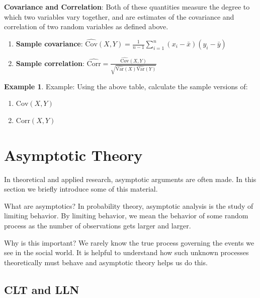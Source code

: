 \documentclass[
]{book}
\providecommand{\tightlist}{%
  \setlength{\itemsep}{0pt}\setlength{\parskip}{0pt}}
\theoremstyle{definition}
\theoremstyle{definition}
\newtheorem{example}{Example}[chapter]
\theoremstyle{definition}
\theoremstyle{remark}
\begin{document}
\textbf{Covariance and Correlation}: Both of these quantities measure the degree to which two variables vary together, and are estimates of the covariance and correlation of two random variables as defined above.

\begin{enumerate}
\def\labelenumi{\arabic{enumi}.}
\tightlist
\item
  \textbf{Sample covariance}: \(\hat{\text{Cov}}(X,Y) = \frac{1}{n-1}\sum_{i = 1}^n(x_i - \bar{x})(y_i - \bar{y})\)
\item
  \textbf{Sample correlation}: \(\hat{\text{Corr}} = \frac{\hat{\text{Cov}}(X,Y)}{\sqrt{\hat{\text{Var}}(X)\hat{\text{Var}}(Y)}}\)
\end{enumerate}

\begin{example}
\protect\hypertarget{exm:unnamed-chunk-94}{}{\label{exm:unnamed-chunk-94} }Example: Using the above table, calculate the sample versions of:

\begin{enumerate}
\def\labelenumi{\arabic{enumi}.}
\tightlist
\item
  \(\text{Cov}(X,Y)\)
\item
  \(\text{Corr}(X, Y)\)
\end{enumerate}
\end{example}

\hypertarget{asymptotic-theory}{%
\section{Asymptotic Theory}\label{asymptotic-theory}}

In theoretical and applied research, asymptotic arguments are often made. In this section we briefly introduce some of this material.

What are asymptotics? In probability theory, asymptotic analysis is the study of limiting behavior. By limiting behavior, we mean the behavior of some random process as the number of observations gets larger and larger.

Why is this important? We rarely know the true process governing the events we see in the social world. It is helpful to understand how such unknown processes theoretically must behave and asymptotic theory helps us do this.

\hypertarget{clt-and-lln}{%
\subsection{CLT and LLN}\label{clt-and-lln}}
\end{document}

